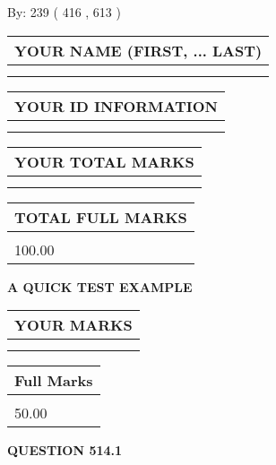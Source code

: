 \documentclass[12pt]{article}
\begin{document}
   
\hspace{1.0in} By: 
 239 ( 416 ,  613 )
   
   
   
   
\newpage 
\setcounter{page}{ 
   514001 } 
   
   
   
   
\noindent\begin{tabular}{|l|}
\hline
YOUR NAME (FIRST, ... LAST)  \\
\hline
 \\ 
 \\ 
\hline
\end{tabular}
\hspace{0.05in} \begin{tabular}{|l|}
\hline
 YOUR   ID   INFORMATION  \\
\hline
 \\ 
 \\ 
\hline
\end{tabular}
   
   
\vspace{0.2in}\noindent\begin{tabular}{|l|}
\hline
YOUR TOTAL MARKS  \\
\hline
 \\ 
 \\ 
\hline
\end{tabular}
\hspace{0.05in} \begin{tabular}{|l|}
\hline
TOTAL FULL MARKS  \\
\hline
 \\ 
100.00 \\
\hline
\end{tabular}
   
   
 \vspace{0.2in}
{\LARGE {\textbf{ A QUICK TEST EXAMPLE}}}
   
   
  
\vspace{0.2in}
  
\noindent\begin{tabular}{|l|}
\hline
 YOUR MARKS  \\
\hline
 \\ 
 \\ 
\hline
\end{tabular}
\hspace{0.05in} \begin{tabular}{|l|}
\hline
 Full Marks  \\
\hline
 \\ 
50.00 \\
\hline
\end{tabular}
{\textbf{\Large{QUESTION
514.1 
}}}
  
\end{document}
